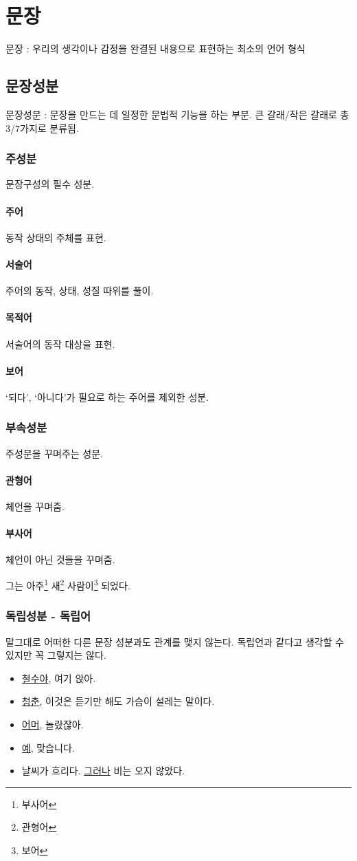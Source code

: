 \documentclass[10pt]{report}
\newcommand{\tl}{\textquoteleft}
\newcommand{\tr}{\textquoteright}
\begin{document}
\chapter{문장}
문장 : 우리의 생각이나 감정을 완결된 내용으로 표현하는 최소의 언어 형식
\section{문장성분}
문장성분 : 문장을 만드는 데 일정한 문법적 기능을 하는 부분. 큰 갈래/작은 갈래로 총 3/7가지로 분류됨.
\subsection{주성분}
문장구성의 필수 성분.
\subsubsection{주어}
동작 상태의 주체를 표현.
\subsubsection{서술어}
주어의 동작, 상태, 성질 따위를 풀이.
\subsubsection{목적어}
서술어의 동작 대상을 표현.
\subsubsection{보어}
\tl 되다\tr, \tl 아니다\tr 가 필요로 하는 주어를 제외한 성분.
\subsection{부속성분}
주성분을 꾸며주는 성분.
\subsubsection{관형어}
체언을 꾸며줌.
\subsubsection{부사어}
체언이 아닌 것들을 꾸며줌.
\begin{center}
	그는 아주\footnote{부사어} 새\footnote{관형어} 사람이\footnote{보어} 되었다.
\end{center}
\subsection{독립성분 - 독립어}
말그대로 어떠한 다른 문장 성분과도 관계를 맺지 않는다. 독립언과 같다고 생각할 수 있지만 꼭 그렇지는 않다.
\begin{itemize}
\item \underline{철수야}, 여기 앉아.
\item \underline{청춘}, 이것은 듣기만 해도 가슴이 설레는 말이다.
\item \underline{어머}, 놀랐잖아.
\item \underline{예}, 맞습니다.
\item 날씨가 흐리다. \underline{그러나} 비는 오지 않았다.
\end{itemize}
\end{document}
